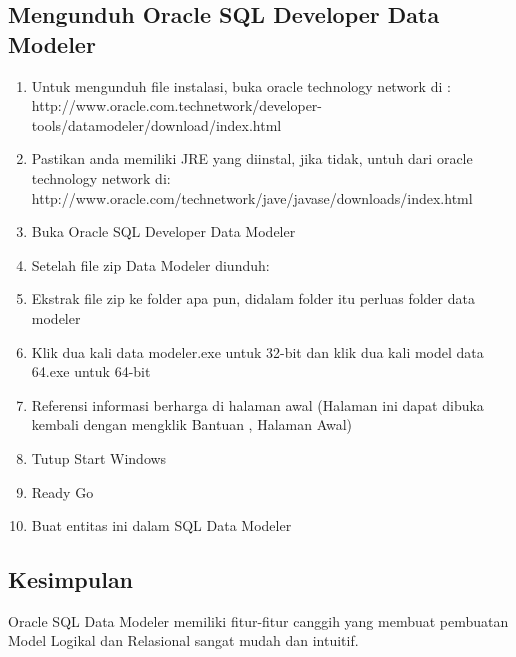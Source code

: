 \documentclass{article}
\begin{document}
\subsection{Mengunduh Oracle SQL Developer Data Modeler} 
\begin{enumerate}
	\item Untuk mengunduh file instalasi, buka oracle technology network di :
http://www.oracle.com.technetwork/developer-tools/datamodeler/download/index.html
\item Pastikan anda memiliki JRE yang diinstal, jika tidak, untuh dari oracle technology network di:
http://www.oracle.com/technetwork/jave/javase/downloads/index.html

\item Buka Oracle SQL Developer Data Modeler
\item Setelah file zip Data Modeler diunduh:
\item Ekstrak file zip ke folder apa pun, didalam folder itu perluas folder data modeler
\item Klik dua kali data modeler.exe untuk 32-bit dan klik dua kali model data 64.exe untuk 64-bit
\item Referensi informasi berharga di halaman awal (Halaman ini dapat dibuka kembali dengan mengklik Bantuan , Halaman Awal)
\item Tutup Start Windows
\item Ready Go
\item Buat entitas ini dalam SQL Data Modeler
\end {enumerate}
\subsection {Kesimpulan}
Oracle SQL Data Modeler memiliki fitur-fitur canggih yang membuat  pembuatan Model Logikal dan Relasional sangat mudah dan intuitif.
\end{document}
